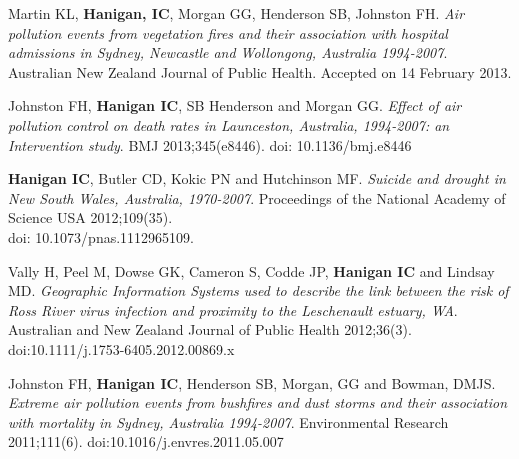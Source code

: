 \documentclass[a4paper,11pt]{article}
\begin{document}
\normalsize

 
\renewcommand{\labelenumi}{\textsc{a}\theenumi.}
\begin{revnumerate}

\item Martin KL, \textbf{Hanigan, IC}, Morgan GG, Henderson SB, Johnston FH. \emph{Air pollution events from vegetation fires and their association with hospital admissions in Sydney, Newcastle and Wollongong, Australia 1994-2007}. Australian New Zealand Journal of Public Health. Accepted on 14 February 2013.


\item Johnston FH, \textbf{Hanigan IC}, SB Henderson and Morgan GG. \emph{Effect of air pollution control on death rates in Launceston, Australia, 1994-2007: an Intervention study}.  BMJ 2013;345(e8446). doi: 10.1136/bmj.e8446

\item \textbf{Hanigan IC}, Butler CD, Kokic PN and Hutchinson MF. \emph{Suicide and drought in New South Wales, Australia, 1970-2007}.  Proceedings of the National Academy of Science USA 2012;109(35).\\
doi: 10.1073/pnas.1112965109.

\item  Vally H, Peel M, Dowse GK, Cameron S, Codde JP, \textbf{Hanigan IC} and Lindsay MD. \emph{Geographic Information Systems used to describe the link between the risk of Ross River virus infection and proximity to the Leschenault estuary, WA}. Australian and New Zealand Journal of Public Health 2012;36(3). doi:10.1111/j.1753-6405.2012.00869.x

\item Johnston FH, \textbf{Hanigan IC}, Henderson SB, Morgan, GG and Bowman, DMJS. \emph{Extreme air pollution events from bushfires and dust storms and their association with mortality in Sydney, Australia 1994-2007}.  Environmental Research 2011;111(6). doi:10.1016/j.envres.2011.05.007


\end{revnumerate}
\end{document}
